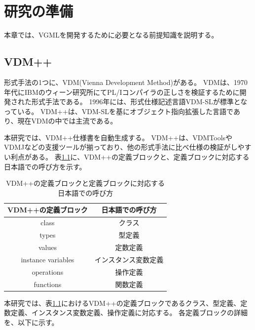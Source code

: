\chapter{研究の準備}
\label{cha:Preparation}

本章では、VGMLを開発するために必要となる前提知識を説明する。

\section{VDM++}
\label{sec:vdm}

形式手法の1つに、VDM(Vienna Development Method)がある\cite{}。
VDMは、1970年代にIBMのウィーン研究所にてPL/Iコンパイラの正しさを検証するために開発された形式手法である。
1996年には、形式仕様記述言語VDM-SLが標準となっている\cite{}。
VDM++は、VDM-SLを基にオブジェクト指向拡張した言語であり、現在VDMの中では主流である。

本研究では、VDM++仕様書を自動生成する。
VDM++は、VDMTools\cite{}やVDMJ\cite{}などの支援ツールが揃っており、他の形式手法に比べ仕様の検証がしやすい利点がある。
表\ref{table:vdm_block}に、VDM++の定義ブロックと、定義ブロックに対応する日本語での呼び方を示す。

\begin{table}[t]
    \begin{center}      
        \caption{VDM++の定義ブロックと定義ブロックに対応する日本語での呼び方}\label{table:vdm_block}
        \begin{tabular}{c|c}
        VDM++の定義ブロック  & 日本語での呼び方　\\ \hline \hline
        class & クラス \\ \hline
        types	 & 型定義 \\ \hline
        values  & 定数定義 \\ \hline
        instance variables & インスタンス変数定義 \\ \hline
        operations & 操作定義 \\ \hline 
        functions  & 関数定義 \\ \hline 
        \end{tabular}
    \end{center}
\end{table}

本研究では、表\ref{table:vdm_block}におけるVDM++の定義ブロックであるクラス、型定義、定数定義、インスタンス変数定義、操作定義に対応する。
各定義ブロックの詳細を、以下に示す。

